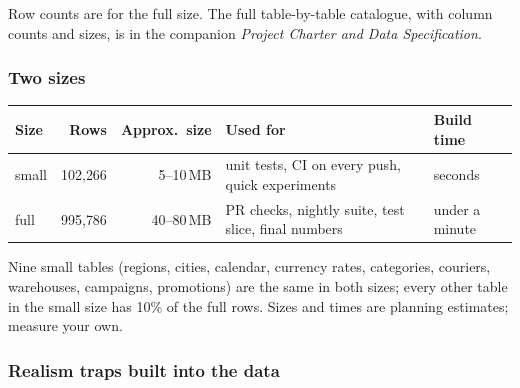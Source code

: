 \documentclass[11pt,a4paper]{article}
\begin{document}
\begin{center}
\end{center}
{\footnotesize\color{grey} Row counts are for the full size. The full table-by-table catalogue, with
column counts and sizes, is in the companion \emph{Project Charter and Data Specification}.}

\subsubsection*{Two sizes}

\begin{center}
\small
\begin{tabular}{@{}l r r l l@{}}
\toprule
\textbf{Size} & \textbf{Rows} & \textbf{Approx.\ size} & \textbf{Used for} & \textbf{Build time}\\
\midrule
small & 102{,}266 & 5--10\,MB & unit tests, CI on every push, quick experiments & seconds\\
full & 995{,}786 & 40--80\,MB & PR checks, nightly suite, test slice, final numbers & under a minute\\
\bottomrule
\end{tabular}

{\footnotesize\color{grey} Nine small tables (regions, cities, calendar, currency rates, categories,
couriers, warehouses, campaigns, promotions) are the same in both sizes; every other table in the
small size has 10\% of the full rows. Sizes and times are planning estimates; measure your own.}
\end{center}

\subsubsection*{Realism traps built into the data}
\end{document}
